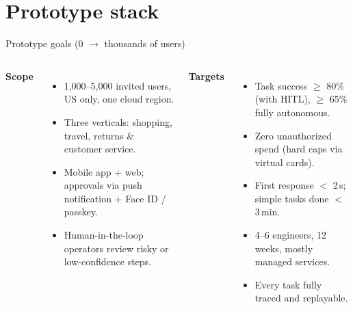 \documentclass[aspectratio=169,10pt]{beamer}
\begin{document}
\section{Prototype stack}
\begin{frame}{Prototype goals (0 $\rightarrow$ thousands of users)}
\begin{columns}[T]
\small
\textbf{Scope}
\begin{itemize}
  \item 1,000--5,000 invited users, US only, one cloud region.
  \item Three verticals: shopping, travel, returns \& customer service.
  \item Mobile app + web; approvals via push notification + Face ID / passkey.
  \item Human-in-the-loop operators review risky or low-confidence steps.
\end{itemize}
\small
\textbf{Targets}
\begin{itemize}
  \item Task success $\ge$ 80\% (with HITL), $\ge$ 65\% fully autonomous.
  \item Zero unauthorized spend (hard caps via virtual cards).
  \item First response $<$ 2\,s; simple tasks done $<$ 3\,min.
  \item 4--6 engineers, 12 weeks, mostly managed services.
  \item Every task fully traced and replayable.
\end{itemize}
\end{columns}
\end{frame}
\end{document}
